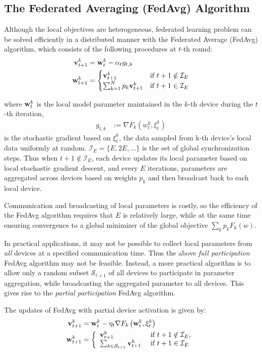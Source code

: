 \subsection{The Federated Averaging (FedAvg) Algorithm}
Although the local objectives are heterogeneous, federated learning
problem can be solved efficiently in a distributed manner with
the Federated Average (FedAvg) algorithm, which consists of
the following procedures at $t$-th round: 
\begin{align}
{\mathbf{v}}_{t+1}^{k} & ={\mathbf{w}}_{t}^{k}-\alpha_{t}g_{t,k}\\
{\mathbf{w}}_{t+1}^{k} & =\begin{cases}
{\mathbf{v}}_{t+1}^{k} & \text{if }t+1\notin\mathcal{I}_{E}\\
\sum_{k=1}^{N}p_{k}{\mathbf{v}}_{t+1}^{k} & \text{if }t+1\in\mathcal{I}_{E}
\end{cases}
\end{align}

where ${\mathbf{w}}_t^k$ is the local model parameter maintained in the $k$-th device during the $t$-th iteration, 
\begin{align}
g_{t,k} & :=\nabla F_{k}(w_{t}^{k},\xi_{t}^{k})
\end{align} 
is the stochastic gradient based on $\xi_{t}^{k}$, the data sampled from k-th device’s local data uniformly at random. $\mathcal{I}_{E}=\{E,2E,\dots\}$
is the set of global synchronization steps. Thus when $t+1 \notin \mathcal{I}_{E}$, each device updates its local parameter based on local
stochastic gradient descent, and every $E$ iterations, parameters are aggregated
across devices based on weights $p_{k}$ and then broadcast back to
each local device. 

Communication and broadcasting of local parameters
is costly, so the efficiency of the FedAvg algorithm requires that
$E$ is relatively large, while at the same time ensuring convergence
to a global minimizer of the global objective $\sum_{k}p_{k}F_{k}(w)$. 

In practical applications, it may not be possible to collect local
parameters from \emph{all }devices at a specified communication time.
Thus the above \emph{full participation }FedAvg algorithm may not
be feasible. Instead, a more practical algorithm is to allow only
a random subset $\mathcal{S}_{t+1}$ of all devices to participate in parameter aggregation, while
broadcasting the aggregated parameter to all devices. This gives rise
to the \emph{partial participation }FedAvg algorithm. 

The updates of FedAvg with partial device activation is given by: 
\begin{align} 
\mathbf{v}_{t+1}^{k} &=\mathbf{w}_{t}^{k}-\eta_{t} \nabla F_{k}\left(\mathbf{w}_{t}^{k}, \xi_{t}^{k}\right) \\ \mathbf{w}_{t+1}^{k} &=\left\{\begin{array}{ll}\mathbf{v}_{t+1}^{k} & \text { if } t+1 \notin \mathcal{I}_{E}, \\ 
\sum_{k \in {\mathcal{S}}_{t+1}} \mathbf{v}_{t+1}^{k} & \text { if } t+1 \in \mathcal{I}_{E}\end{array}\right.
\end{align}

